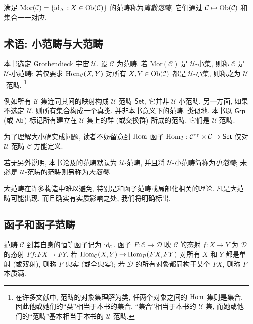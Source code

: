 满足 $\operatorname{Mor}(\mathcal{C}) = \left\{ \mathrm{id}_X : X \in \operatorname{Ob}(\mathcal{C}) \right\}$ 的范畴称为\emph{离散范畴}, 它们通过 $\mathcal{C} \mapsto \operatorname{Ob}(\mathcal{C})$ 和集合一一对应.

\subsection*{术语: 小范畴与大范畴}
本书选定 Grothendieck 宇宙 $\mathcal{U}$. 设 $\mathcal{C}$ 为范畴. 若 $\mathrm{Mor}(\mathcal{C})$ 是 $\mathcal{U}$-小集, 则称 $\mathcal{C}$ 是 $\mathcal{U}$-小范畴; 若仅要求 $\operatorname{Hom}_{\mathcal{C}}(X, Y)$ 对所有 $X, Y \in \operatorname{Ob}(\mathcal{C})$ 都是 $\mathcal{U}$-小集, 则称之为 $\mathcal{U}$-范畴.
\footnote{在许多文献中, 范畴的对象集理解为类, 任两个对象之间的 $\operatorname{Hom}$ 集则是集合. 因此他或她们的``类''相当于本书的集合, ``集合''相当于本书的 $\mathcal{U}$-集, 而她或他们的``范畴''基本相当于本书的 $\mathcal{U}$-范畴.}

例如所有 $\mathcal{U}$-集连同其间的映射构成 $\mathcal{U}$-范畴 $\mathsf{Set}$, 它并非 $\mathcal{U}$-小范畴. 另一方面, 如果不选定 $\mathcal{U}$, 则所有集合构成一个真类, 并非本书意义下的范畴. 类似地, 本书以 $\mathsf{Grp}$ (或 $\mathsf{Ab}$) 标记所有建立在 $\mathcal{U}$-集上的群 (或交换群) 所成的范畴, 它们是 $\mathcal{U}$-范畴.

为了理解大小确实成问题, 读者不妨留意到 $\operatorname{Hom}$ 函子 $\operatorname{Hom}_{\mathcal{C}}: \mathcal{C}^{\operatorname{op}} \times \mathcal{C} \to \mathsf{Set}$ 仅对 $\mathcal{U}$-范畴 $\mathcal{C}$ 方能定义.

若无另外说明, 本书论及的范畴默认为 $\mathcal{U}$-范畴, 并且将 $\mathcal{U}$-小范畴简称为\emph{小范畴}; 未必是 $\mathcal{U}$-范畴的范畴则另称为\emph{大范畴}.

大范畴在许多构造中难以避免, 特别是和函子范畴或局部化相关的理论. 凡是大范畴可能出现, 而且确实有实质影响之处, 我们将明确标出.

\subsection*{函子和函子范畴}
范畴 $\mathcal{C}$ 到其自身的恒等函子记为 $\mathrm{id}_{\mathcal{C}}$. 函子 $F: \mathcal{C} \to \mathcal{D}$ 映 $\mathcal{C}$ 的态射 $f: X \to Y$ 为 $\mathcal{D}$ 的态射 $Ff: FX \to FY$. 若 $\operatorname{Hom}_{\mathcal{C}}(X, Y) \to \operatorname{Hom}_{\mathcal{D}}(FX, FY)$ 对所有 $X$ 和 $Y$ 都是单射 (或双射), 则称 $F$ 忠实 (或全忠实); 若 $\mathcal{D}$ 的所有对象都同构于某个 $FX$, 则称 $F$ 本质满.

